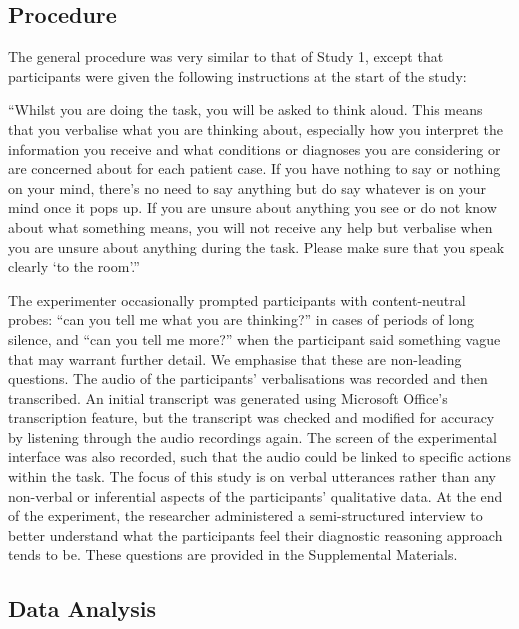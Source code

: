 \documentclass[a4paper, nobind]{templates/ociamthesis}
\begin{document}
\hypertarget{procedure-1}{%
\subsection*{Procedure}\label{procedure-1}}

The general procedure was very similar to that of Study 1, except that participants were given the following instructions at the start of the study:

``Whilst you are doing the task, you will be asked to think aloud. This means that you verbalise what you are thinking about, especially how you interpret the information you receive and what conditions or diagnoses you are considering or are concerned about for each patient case. If you have nothing to say or nothing on your mind, there's no need to say anything but do say whatever is on your mind once it pops up. If you are unsure about anything you see or do not know about what something means, you will not receive any help but verbalise when you are unsure about anything during the task. Please make sure that you speak clearly `to the room'.''

The experimenter occasionally prompted participants with content-neutral probes: ``can you tell me what you are thinking?'' in cases of periods of long silence, and ``can you tell me more?'' when the participant said something vague that may warrant further detail. We emphasise that these are non-leading questions. The audio of the participants' verbalisations was recorded and then transcribed. An initial transcript was generated using Microsoft Office's transcription feature, but the transcript was checked and modified for accuracy by listening through the audio recordings again. The screen of the experimental interface was also recorded, such that the audio could be linked to specific actions within the task. The focus of this study is on verbal utterances rather than any non-verbal or inferential aspects of the participants' qualitative data. At the end of the experiment, the researcher administered a semi-structured interview to better understand what the participants feel their diagnostic reasoning approach tends to be. These questions are provided in the Supplemental Materials.

\hypertarget{data-analysis-1}{%
\subsection*{Data Analysis}\label{data-analysis-1}}
\end{document}
